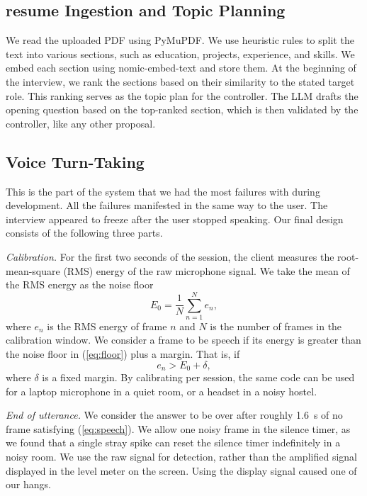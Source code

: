 \documentclass[conference]{IEEEtran}
\begin{document}
\subsection{resume Ingestion and Topic Planning}
We read the uploaded PDF using PyMuPDF. We use heuristic rules to split the text into various sections, such as education, projects, experience, and skills. We embed each section using nomic-embed-text and store them. At the beginning of the interview, we rank the sections based on their similarity to the stated target role. This ranking serves as the topic plan for the controller. The LLM drafts the opening question based on the top-ranked section, which is then validated by the controller, like any other proposal.

\subsection{Voice Turn-Taking}
This is the part of the system that we had the most failures with during development. All the failures manifested in the same way to the user. The interview appeared to freeze after the user stopped speaking. Our final design consists of the following three parts.

\textit{Calibration.} For the first two seconds of the session, the client measures the root-mean-square (RMS) energy of the raw microphone signal. We take the mean of the RMS energy as the noise floor
\begin{equation}
E_0 = \frac{1}{N}\sum_{n=1}^{N} e_n,
\label{eq:floor}
\end{equation}
where $e_n$ is the RMS energy of frame $n$ and $N$ is the number of frames in the calibration window. We consider a frame to be speech if its energy is greater than the noise floor in (\ref{eq:floor}) plus a margin. That is, if
\begin{equation}
e_n > E_0 + \delta,
\label{eq:speech}
\end{equation}
where $\delta$ is a fixed margin. By calibrating per session, the same code can be used for a laptop microphone in a quiet room, or a headset in a noisy hostel.

\textit{End of utterance.} We consider the answer to be over after roughly 1.6~s of no frame satisfying (\ref{eq:speech}). We allow one noisy frame in the silence timer, as we found that a single stray spike can reset the silence timer indefinitely in a noisy room. We use the raw signal for detection, rather than the amplified signal displayed in the level meter on the screen. Using the display signal caused one of our hangs.
\end{document}
